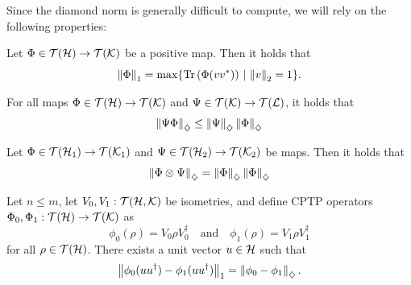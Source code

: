 

Since the diamond norm is generally difficult to compute, we will rely on the following properties:


\begin{theorem} \label{thm:russo_dye}
Let \(\Phi \in \mathcal{T}(\mathcal{H}) \to \mathcal{T}(\mathcal{K})\) be a positive map. Then it holds that
\[
\left\lVert \Phi \right\rVert_{1}= \max \{ \operatorname{Tr} \left( \Phi(vv^*) \right) \, \vert \, \left\lVert v \right\rVert_{2}=1 \}.
\]
\end{theorem}

\begin{proposition} \label{prop:diamond_submult}
  For all maps \(\Phi \in \mathcal{T}(\mathcal{H}) \to \mathcal{T}(\mathcal{K})\) and \(\Psi \in \mathcal{T}(\mathcal{K}) \to \mathcal{T}(\mathcal{L})\), it holds that
  \begin{align*}
    \left\lVert \Psi \Phi \right\rVert_{\diamondsuit} \leq  \left\lVert \Psi \right\rVert_{\diamondsuit} \left\lVert \Phi \right\rVert_{\diamondsuit} 
  \end{align*}
\end{proposition}

\begin{theorem}\label{thm:diamond_tensor_comp}
  Let $\Phi \in \mathcal{T}(\mathcal{H}_1) \to \mathcal{T}(\mathcal{K}_1)$ and \(\Psi \in \mathcal{T}(\mathcal{H}_2) \to \mathcal{T}(\mathcal{K}_2)\) be maps. Then it holds that
\[
\left\lVert \Phi \otimes \Psi \right\rVert_{\diamondsuit} = \left\lVert \Phi \right\rVert_{\diamondsuit}\left\lVert \Phi \right\rVert_{\diamondsuit}
\]
\end{theorem}

\begin{theorem} \cite[Theorem 3.55]{watrous2018theory} \label{theorem:diamond_iso}
  Let  $ n \leq m$, let $V_0,V_1: \mathcal{T}(\mathcal{H},\mathcal{K})$ be isometries, and define CPTP operators $\Phi_0,\Phi_1:\mathcal{T}(\mathcal{H}) \to \mathcal{T}(\mathcal{K})$ as
\[
\phi_0(\rho) = V_0 \rho V_0^\dag \quad \text{and} \quad \phi_1(\rho) = V_1 \rho V_1^\dag
\]
for all $\rho \in \mathcal{T}(\mathcal{H})$. There exists a unit vector $u \in \mathcal{H} $ such that
\[
\left\lVert \phi_0(uu^\dag) - \phi_1(uu^\dag) \right\rVert_{1} = \left\lVert \phi_0 - \phi_1 \right\rVert_{\diamondsuit}.
\]
\end{theorem}

